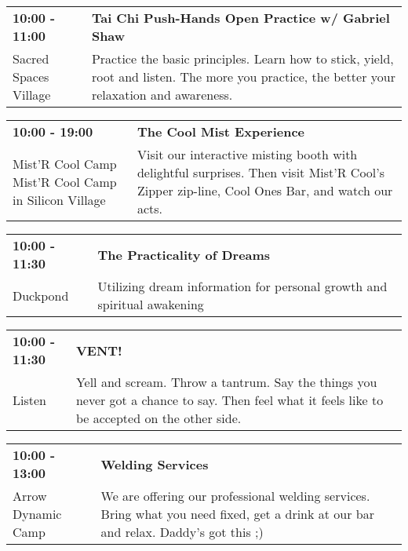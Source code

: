 \begin{tabular}{ p{1in} p{2.2in} }
    \textbf{10:00 - 11:00} & \textbf{Tai Chi Push-Hands Open Practice w/ Gabriel Shaw} \\
    Sacred Spaces Village \newline  & Practice the basic principles. Learn how to stick, yield, root and listen. The more you practice, the better your relaxation and awareness. \\
    \hline 
\end{tabular}
    
\begin{tabular}{ p{1in} p{2.2in} }
    \textbf{10:00 - 19:00} & \textbf{The Cool Mist Experience} \\
    Mist'R Cool Camp \newline Mist'R Cool Camp in Silicon Village & Visit our interactive misting booth with delightful surprises. Then visit Mist'R Cool's Zipper zip-line, Cool Ones Bar, and watch our acts. \\
    \hline 
\end{tabular}
    
\begin{tabular}{ p{1in} p{2.2in} }
    \textbf{10:00 - 11:30} & \textbf{The Practicality of Dreams} \\
    Duckpond \newline  & Utilizing dream information for personal growth and spiritual awakening \\
    \hline 
\end{tabular}
    
\begin{tabular}{ p{1in} p{2.2in} }
    \textbf{10:00 - 11:30} & \textbf{VENT!} \\
    Listen \newline  & Yell and scream. Throw a tantrum. Say the things you never got a chance to say. Then feel what it feels like to be accepted on the other side. \\
    \hline 
\end{tabular}
    
\begin{tabular}{ p{1in} p{2.2in} }
    \textbf{10:00 - 13:00} & \textbf{Welding Services} \\
    Arrow Dynamic Camp \newline  & We are offering our professional welding services.  Bring what you need fixed, get a drink at our bar and relax. Daddy's got this ;) \\
    \hline 
\end{tabular}
    
